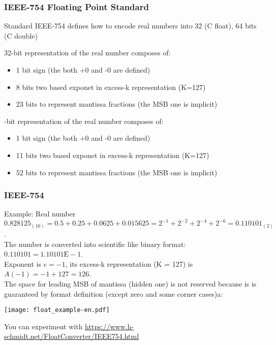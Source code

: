 \documentclass{beamer}
\begin{document}
\begin{frame}
\frametitle{IEEE-754 Floating Point Standard}

Standard IEEE-754 defines how to encode real numbers into 32 (C float), 64 bits (C double)

32-bit representation of the real number composes of:
\begin{itemize}
\item 1 bit sign (the both +0 and -0 are defined)
\item 8 bits two based exponet in excess-k representation (K=127)
\item 23 bits to represent mantissa fractions (the MSB one is implicit)
\end{itemize}
-bit representation of the real number composes of:
\begin{itemize}
\item 1 bit sign (the both +0 and -0 are defined)
\item 11 bits two based exponet in excess-k representation (K=127)
\item 52 bits to represent mantissa fractions (the MSB one is implicit)
\end{itemize}

\end{frame}


\begin{frame}
\frametitle{IEEE-754}

Example:
Real number $0.828125_{(10)} = 0.5+0.25+0.0625+0.015625=2^{-1}+2^{-2}+2^{-4}+2^{-6} = 0.110101_{(2)}$.\\
The number is converted into scientific like binary format: $0.110101 = 1.10101\text{E}-1$.\\
Exponent is $e=-1$, its excess-k representation (K = 127) is $A(-1)=-1+127 = 126$.\\
The space for leading MSB of mantissa (hidden one) is not reserved because is is guaranteed by format definition (except zero and some corner cases)a:

\begin{center}
\texttt{[image: float\_example-en.pdf]}
\end{center}

You can experiment with \url{https://www.h-schmidt.net/FloatConverter/IEEE754.html}
\end{frame}
\end{document}
